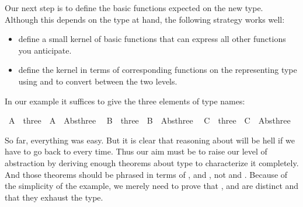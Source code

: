 \begin{isabellebody}
\begin{isamarkuptext}
Our next step is to define the basic functions expected on the new type.
Although this depends on the type at hand, the following strategy works well:
\begin{itemize}
\item define a small kernel of basic functions that can express all other
functions you anticipate.
\item define the kernel in terms of corresponding functions on the
representing type using  and  to convert between the
two levels.
\end{itemize}
In our example it suffices to give the three elements of type 
names:%
\end{isamarkuptext}%
\isamarkuptrue%
\isamarkupfalse%
\ A\ {}{}\ three\ \ {}A\ {}\ Abs{}three\ {}{}\isanewline
{}\isamarkupfalse%
\ B\ {}{}\ three\ \ {}B\ {}\ Abs{}three\ {}{}\isanewline
{}\isamarkupfalse%
\ C\ {}{}\ three\ \ {}C\ {}\ Abs{}three\ {}{}%
\begin{isamarkuptext}%
So far, everything was easy. But it is clear that reasoning about  will be hell if we have to go back to  every time. Thus our
aim must be to raise our level of abstraction by deriving enough theorems
about type  to characterize it completely. And those theorems
should be phrased in terms of ,  and , not  and . Because of the simplicity of the example,
we merely need to prove that ,  and  are distinct
and that they exhaust the type.


\end{isamarkuptext}
\end{isabellebody}
